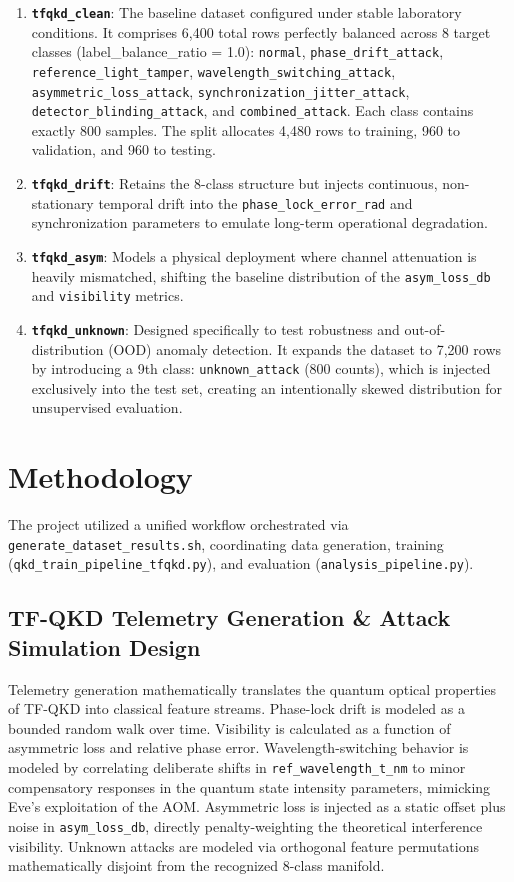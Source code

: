\documentclass[conference]{IEEEtran}
\begin{document}
\begin{enumerate}
    \item \textbf{\texttt{tfqkd\_clean}}: The baseline dataset configured under stable laboratory conditions. It comprises 6,400 total rows perfectly balanced across 8 target classes (label\_balance\_ratio = 1.0): \texttt{normal}, \texttt{phase\_drift\_attack}, \texttt{reference\_light\_tamper}, \texttt{wavelength\_switching\_attack}, \texttt{asymmetric\_loss\_attack}, \texttt{synchronization\_jitter\_attack}, \texttt{detector\_blinding\_attack}, and \texttt{combined\_attack}. Each class contains exactly 800 samples. The split allocates 4,480 rows to training, 960 to validation, and 960 to testing.
    \item \textbf{\texttt{tfqkd\_drift}}: Retains the 8-class structure but injects continuous, non-stationary temporal drift into the \texttt{phase\_lock\_error\_rad} and synchronization parameters to emulate long-term operational degradation.
    \item \textbf{\texttt{tfqkd\_asym}}: Models a physical deployment where channel attenuation is heavily mismatched, shifting the baseline distribution of the \texttt{asym\_loss\_db} and \texttt{visibility} metrics.
    \item \textbf{\texttt{tfqkd\_unknown}}: Designed specifically to test robustness and out-of-distribution (OOD) anomaly detection. It expands the dataset to 7,200 rows by introducing a 9th class: \texttt{unknown\_attack} (800 counts), which is injected exclusively into the test set, creating an intentionally skewed distribution for unsupervised evaluation.
\end{enumerate}

\section{Methodology}

The project utilized a unified workflow orchestrated via \texttt{generate\_dataset\_results.sh}, coordinating data generation, training (\texttt{qkd\_train\_pipeline\_tfqkd.py}), and evaluation (\texttt{analysis\_pipeline.py}).

\subsection{TF-QKD Telemetry Generation \& Attack Simulation Design}
Telemetry generation mathematically translates the quantum optical properties of TF-QKD into classical feature streams. Phase-lock drift is modeled as a bounded random walk over time. Visibility is calculated as a function of asymmetric loss and relative phase error. Wavelength-switching behavior is modeled by correlating deliberate shifts in \texttt{ref\_wavelength\_t\_nm} to minor compensatory responses in the quantum state intensity parameters, mimicking Eve's exploitation of the AOM. Asymmetric loss is injected as a static offset plus noise in \texttt{asym\_loss\_db}, directly penalty-weighting the theoretical interference visibility. Unknown attacks are modeled via orthogonal feature permutations mathematically disjoint from the recognized 8-class manifold.
\end{document}
